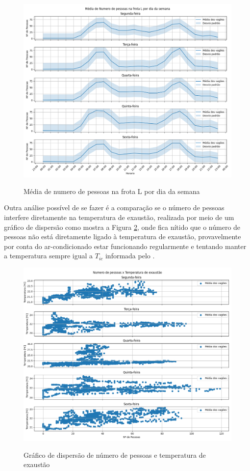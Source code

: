 \documentclass[acronym,symbols,table]{fei}
\begin{document}
\begin{figure}[!htb]
    \centering
    \caption{Média de numero de pessoas na frota L por dia da semana}
    \includegraphics[width=0.8\linewidth]{Imagens/Media_de_Numero_de_pessoas_na_frota_L_por_dia_da_semana.png}
    \label{fig:medianum}
\end{figure}

Outra análise possível de se fazer é a comparação se o número de pessoas interfere diretamente na temperatura de exaustão, realizada por meio de um gráfico de dispersão como mostra a Figura \ref{fig:numerotemperatura}, onde fica nítido que o número de pessoas não está diretamente ligado à temperatura de exaustão, provavelmente por conta do ar-condicionado estar funcionando regularmente e tentando manter a temperatura sempre igual a ${T}_{ic}$ informada pelo \textcite{metrosp2024}. 

\begin{figure}[!htb]
    \centering
    \caption{Gráfico de dispersão de número de pessoas e temperatura de exaustão}
    \includegraphics[width=1.0\linewidth]{Imagens/Numero_de_pessoas_x_Temperatura_de_exaustao.png}
    \label{fig:numerotemperatura}
\end{figure}
\end{document}
